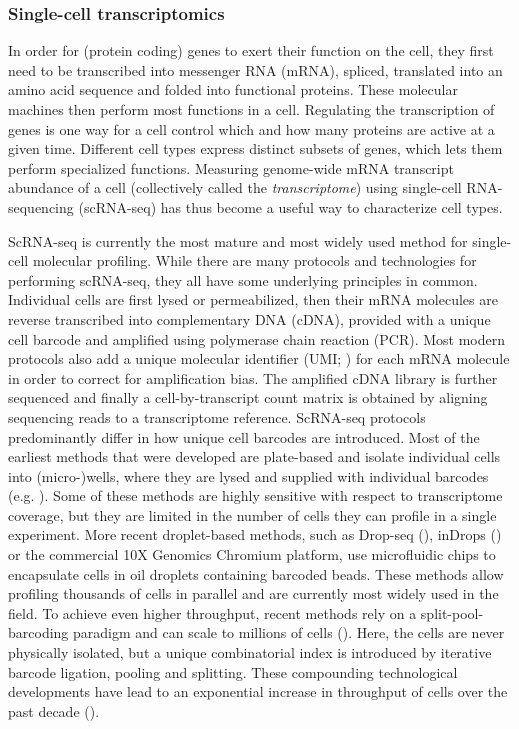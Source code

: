 \subsubsection{Single-cell transcriptomics}

In order for (protein coding) genes to exert their function on the cell, they first need to be transcribed into messenger RNA (mRNA), spliced, translated into an amino acid sequence and folded into functional proteins. These molecular machines then perform most functions in a cell. Regulating the transcription of genes is one way for a cell control which and how many proteins are active at a given time. Different cell types express distinct subsets of genes, which lets them perform specialized functions. Measuring genome-wide mRNA transcript abundance of a cell (collectively called the \textit{transcriptome}) using single-cell RNA-sequencing (scRNA-seq) has thus become a useful way to characterize cell types. 

ScRNA-seq is currently the most mature and most widely used method for single-cell molecular profiling. While there are many protocols and technologies for performing scRNA-seq, they all have some underlying principles in common. Individual cells are first lysed or permeabilized, then their mRNA molecules are reverse transcribed into complementary DNA (cDNA), provided with a unique cell barcode and amplified using polymerase chain reaction (PCR). Most modern protocols also add a unique molecular identifier (UMI; \cite{islam_quantitative_2014}) for each mRNA molecule in order to correct for amplification bias. The amplified cDNA library is further sequenced and finally a cell-by-transcript count matrix is obtained by aligning sequencing reads to a transcriptome reference. ScRNA-seq protocols predominantly differ in how unique cell barcodes are introduced. Most of the earliest methods that were developed are plate-based and isolate individual cells into (micro-)wells, where they are lysed and supplied with individual barcodes (e.g. \cite{picelli_smart-seq2_2013,shalek_single-cell_2014,jaitin_massively_2014,treutlein_reconstructing_2014}). Some of these methods are highly sensitive with respect to transcriptome coverage, but they are limited in the number of cells they can profile in a single experiment. More recent droplet-based methods, such as Drop-seq (\cite{macosko_highly_2015}), inDrops (\cite{klein_droplet_2015}) or the commercial 10X Genomics Chromium platform, use microfluidic chips to encapsulate cells in oil droplets containing barcoded beads. These methods allow profiling thousands of cells in parallel and are currently most widely used in the field. To achieve even higher throughput, recent methods rely on a split-pool-barcoding paradigm and can scale to millions of cells (\cite{rosenberg_single-cell_2018,yin_high-throughput_2019,cao_comprehensive_2017}). Here, the cells are never physically isolated, but a unique combinatorial index is introduced by iterative barcode ligation, pooling and splitting. These compounding technological developments have lead to an exponential increase in throughput of cells over the past decade (\cite{svensson_exponential_2018}).


